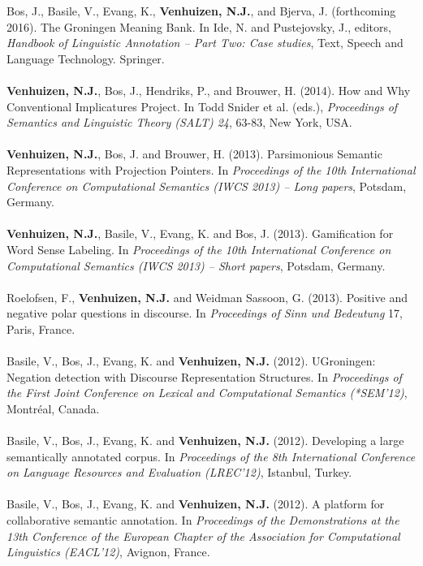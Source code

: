 \documentclass[a4paper,10pt]{article}
\begin{document}
\noindent
    Bos, J., Basile, V., Evang, K., \textbf{Venhuizen, N.J.}, and Bjerva, J.
    (forthcoming 2016). The Groningen Meaning Bank. In Ide, N. and Pustejovsky, J.,
    editors, \textit{Handbook of Linguistic Annotation -- Part Two: Case
    studies}, Text, Speech and Language Technology. Springer.\\
    \\
    \textbf{Venhuizen, N.J.}, Bos, J., Hendriks, P., and Brouwer, H. (2014).
    How and Why Conventional Implicatures Project. In Todd Snider et al.
    (eds.), \textit{Proceedings of Semantics and Linguistic Theory (SALT) 24},
    63-83, New York, USA.\\
    \\
    \textbf{Venhuizen, N.J.}, Bos, J. and Brouwer, H. (2013). Parsimonious 
    Semantic Representations with Projection Pointers. In \textit{Proceedings
    of the 10th International Conference on Computational Semantics (IWCS 2013)
    -- Long papers}, Potsdam, Germany.\\
    \\
    \textbf{Venhuizen, N.J.}, Basile, V., Evang, K. and Bos, J. (2013).
    Gamification for Word Sense Labeling. In \textit{Proceedings of the 10th 
    International Conference on Computational Semantics (IWCS 2013) --
    Short papers}, Potsdam, Germany.\\
    \\
    Roelofsen, F., \textbf{Venhuizen, N.J.} and Weidman Sassoon, G. (2013).
    Positive and negative polar questions in discourse. In \textit{Proceedings of
    Sinn und Bedeutung} 17, Paris, France.\\
    \\
    Basile, V., Bos, J., Evang, K. and \textbf{Venhuizen, N.J.} (2012). UGroningen:
    Negation detection with Discourse Representation Structures. In
    \textit{Proceedings of the First Joint Conference on Lexical and Computational
    Semantics (*SEM'12)}, Montr\'eal, Canada.\\
    \\
    Basile, V., Bos, J., Evang, K. and \textbf{Venhuizen, N.J.} (2012). Developing
    a large semantically annotated corpus. In \textit{Proceedings of the 8th
    International Conference on Language Resources and Evaluation (LREC'12)},
    Istanbul, Turkey.\\
    \\
    Basile, V., Bos, J., Evang, K. and \textbf{Venhuizen, N.J.} (2012). A platform
    for collaborative semantic annotation. In \textit{Proceedings of the
    Demonstrations at the 13th Conference of the European Chapter of the
    Association for Computational Linguistics (EACL'12)}, Avignon, France.
\end{document}
